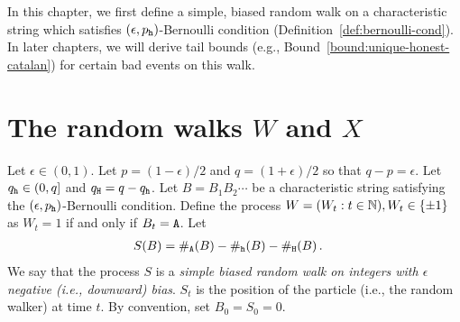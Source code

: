 


In this chapter, we first define a simple, biased random walk on a characteristic string 
which satisfies $(\epsilon, p_{\mathtt{h}})$-Bernoulli condition (Definition~\ref{def:bernoulli-cond}).
In later chapters, we will derive tail bounds (e.g., Bound~\ref{bound:unique-honest-catalan}) 
for certain bad events on this walk.


\section{\texorpdfstring{The random walks $W$ and $X$}{Two random walks on integers}}
  Let $\epsilon \in (0,1)$. 
  Let $p = (1 - \epsilon)/2$ and $q = (1 + \epsilon)/2$ 
  so that $q - p = \epsilon$. 
  Let $q_{\mathtt{h}} \in (0, q]$ and $q_{\mathtt{H}} = q - q_{\mathtt{h}}$. 
  Let $B = B_1 B_2 \cdots$ be a characteristic string 
  satisfying the $(\epsilon, p_{\mathtt{h}})$-Bernoulli condition. 
  Define the process $W = (W_t : t \in \mathbb{N}), W_t \in \{\pm 1\}$ as $W_t = 1$ if and only if $B_t = \mathtt{A}$. 
  Let 
  \begin{align*}
    S(B) &= \#_{\mathtt{A}}(B) - \#_{\mathtt{h}}(B) - \#_{\mathtt{H}}(B)\,.
  \end{align*}
  We say that the process $S$ is a \emph{simple biased random walk on integers with $\epsilon$ negative (i.e., downward) bias}. 
  $S_t$ is the position of the particle (i.e., the random walker) at time $t$. 
  By convention, set $B_0 = S_0 = 0$. 


